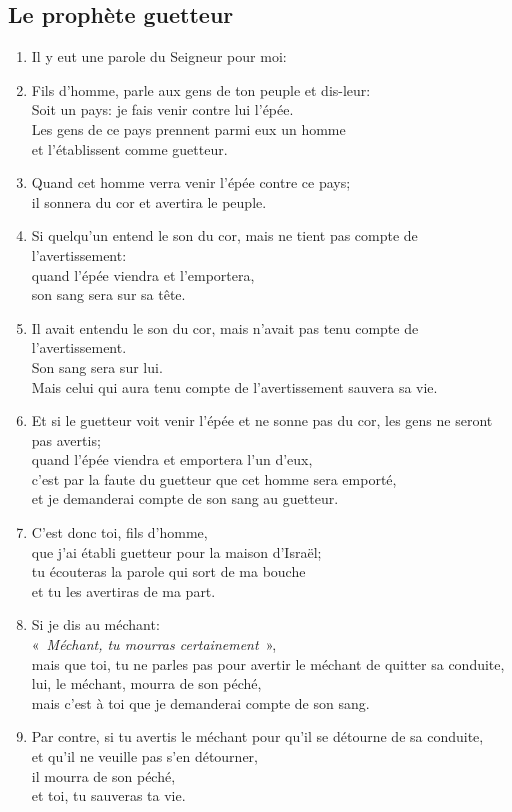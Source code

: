 \subsection*{Le prophète guetteur}
\begin{enumerate}[leftmargin=\psleftmargin, labelsep = \pslabelsep, label={\arabic*}, font=\color{\pscolor}\small\textsuperscript, parsep=0em, itemsep=0em, topsep=0em ]
    \item Il y eut une parole du Seigneur pour moi:
    \item Fils d’homme, parle aux gens de ton peuple et dis-leur: \\ Soit un pays: je fais venir contre lui l’épée.\\ Les gens de ce pays prennent parmi eux un homme \\ et l’établissent comme guetteur.
    \item Quand cet homme verra venir l’épée contre ce pays; \\ il sonnera du cor et avertira le peuple.
    \item Si quelqu’un entend le son du cor, mais ne tient pas compte de l’avertissement: \\ quand l’épée viendra et l’emportera, \\ son sang sera sur sa tête.
    \item Il avait entendu le son du cor, mais n’avait pas tenu compte de l’avertissement. \\ Son sang sera sur lui. \\ Mais celui qui aura tenu compte de l’avertissement sauvera sa vie.
    \item Et si le guetteur voit venir l’épée et ne sonne pas du cor, les gens ne seront pas avertis; \\ quand l’épée viendra et emportera l’un d’eux, \\ c’est par la faute du guetteur que cet homme sera emporté,
          \\ et je demanderai compte de son sang au guetteur. \parSpace

    \item C’est donc toi, fils d’homme, \\ que j’ai établi guetteur pour la maison d’Israël;\\ tu écouteras la parole qui sort de ma bouche \\ et tu les avertiras de ma part.
    \item Si je dis au méchant: \\ \decalage «~\textit{Méchant, tu mourras certainement}~»,\\ mais que toi, tu ne parles pas pour avertir le méchant de quitter sa conduite, \\ lui, le méchant, mourra de son péché, \\ mais c’est à toi que je demanderai compte de son sang.
    \item Par contre, si tu avertis le méchant pour qu’il se détourne de sa conduite, \\ et qu’il ne veuille pas s’en détourner, \\ il mourra de son péché, \\ et toi, tu sauveras ta vie. \parSpace


\end{enumerate}
